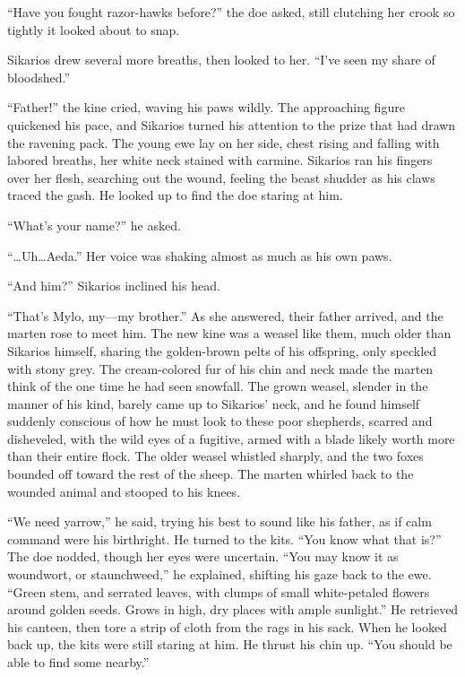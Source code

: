 ``Have you fought razor-hawks before?'' the doe asked, still clutching her crook so tightly it looked about to snap.

Sikarios drew several more breaths, then looked to her. ``I've seen my share of bloodshed.''

``Father!'' the kine cried, waving his paws wildly. The approaching figure quickened his pace, and Sikarios turned his attention to the prize that had drawn the ravening pack. The young ewe lay on her side, chest rising and falling with labored breaths, her white neck stained with carmine. Sikarios ran his fingers over her flesh, searching out the wound, feeling the beast shudder as his claws traced the gash. He looked up to find the doe staring at him.

``What's your name?'' he asked.

``\ldots Uh\ldots Aeda.'' Her voice was shaking almost as much as his own paws.

``And him?'' Sikarios inclined his head.

``That's Mylo, my---my brother.'' As she answered, their father arrived, and the marten rose to meet him. The new kine was a weasel like them, much older than Sikarios himself, sharing the golden-brown pelts of his offspring, only speckled with stony grey. The cream-colored fur of his chin and neck made the marten think of the one time he had seen snowfall. The grown weasel, slender in the manner of his kind, barely came up to Sikarios' neck, and he found himself suddenly conscious of how he must look to these poor shepherds, scarred and disheveled, with the wild eyes of a fugitive, armed with a blade likely worth more than their entire flock. The older weasel whistled sharply, and the two foxes bounded off toward the rest of the sheep. The marten whirled back to the wounded animal and stooped to his knees.

``We need yarrow,'' he said, trying his best to sound like his father, as if calm command were his birthright. He turned to the kits. ``You know what that is?'' The doe nodded, though her eyes were uncertain. ``You may know it as woundwort, or staunchweed,'' he explained, shifting his gaze back to the ewe. ``Green stem, and serrated leaves, with clumps of small white-petaled flowers around golden seeds. Grows in high, dry places with ample sunlight.'' He retrieved his canteen, then tore a strip of cloth from the rags in his sack. When he looked back up, the kits were still staring at him. He thrust his chin up. ``You should be able to find some nearby.''

